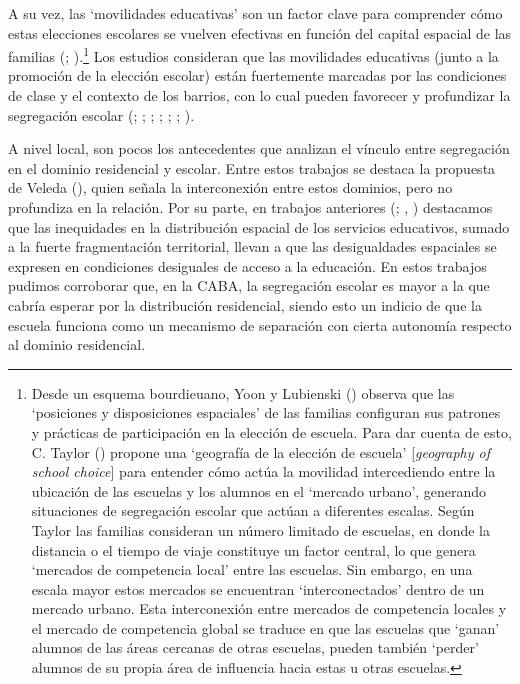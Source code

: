\documentclass[
  spanish,
  a4paper,%
  chapterprefix=true,%
  DIV=calc,%
  twoside]{scrbook}%
\begin{document}
A su vez, las `movilidades educativas' son un factor clave para
comprender cómo estas elecciones escolares se vuelven efectivas en
función del capital espacial de las familias (; ).\footnote{Desde un esquema bourdieuano, Yoon y Lubienski ()
  observa que las `posiciones y disposiciones espaciales' de las
  familias configuran sus patrones y prácticas de participación en la
  elección de escuela. Para dar cuenta de esto, C. Taylor () propone
  una `geografía de la elección de escuela' {[}\emph{geography of school
  choice}{]} para entender cómo actúa la movilidad intercediendo entre
  la ubicación de las escuelas y los alumnos en el `mercado urbano',
  generando situaciones de segregación escolar que actúan a diferentes
  escalas. Según Taylor las familias consideran un número limitado de
  escuelas, en donde la distancia o el tiempo de viaje constituye un
  factor central, lo que genera `mercados de competencia local' entre
  las escuelas. Sin embargo, en una escala mayor estos mercados se
  encuentran `interconectados' dentro de un mercado urbano. Esta
  interconexión entre mercados de competencia locales y el mercado de
  competencia global se traduce en que las escuelas que `ganan'
  alumnos de las áreas cercanas de otras escuelas, pueden también
  `perder' alumnos de su propia área de influencia hacia estas u otras
  escuelas.} Los estudios consideran que las
movilidades educativas (junto a la promoción de la elección escolar)
están fuertemente marcadas por las condiciones de clase y el contexto de
los barrios, con lo cual pueden favorecer y profundizar la segregación
escolar (; ; ; ; ; ; ).

A nivel local, son pocos los antecedentes que analizan el vínculo entre
segregación en el dominio residencial y escolar. Entre estos trabajos se
destaca la propuesta de Veleda (), quien señala la interconexión entre
estos dominios, pero no profundiza en la relación. Por su parte, en
trabajos anteriores (; , )
destacamos que las inequidades en la distribución espacial de los
servicios educativos, sumado a la fuerte fragmentación territorial,
llevan a que las desigualdades espaciales se expresen en condiciones
desiguales de acceso a la educación. En estos trabajos pudimos
corroborar que, en la CABA, la segregación escolar es mayor a la que
cabría esperar por la distribución residencial, siendo esto un indicio
de que la escuela funciona como un mecanismo de separación con cierta
autonomía respecto al dominio residencial.
\end{document}

